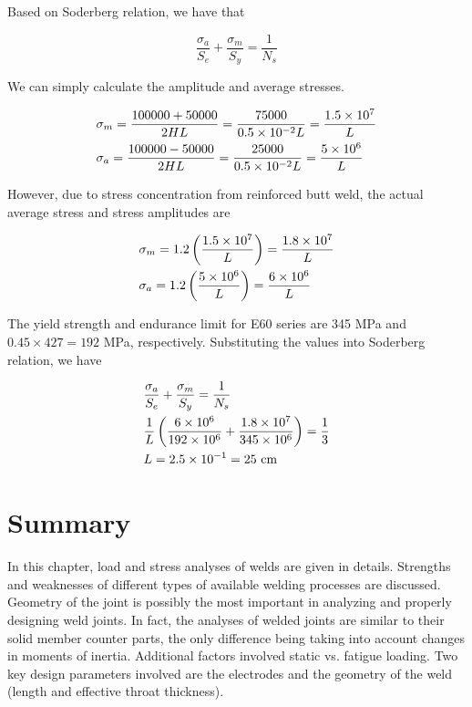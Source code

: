 \documentclass[
10pt,
a4paper,
openany,
svgnames,
]{book}
\begin{document}
\begin{solution}
  Based on Soderberg relation, we have that

  \[\frac{\sigma _a}{S_e} + \frac{\sigma _m}{S_y} = \frac{1}{N_s}\]

  We can simply calculate the amplitude and average stresses.

  \[\begin{gathered}
      \sigma_m = \frac{100000 + 50000}{2HL} = \frac{75000}{0.5 \times 10^{-2}L} = \frac{1.5 \times 10^7}{L} \hfill \\
      \sigma_a = \frac{100000 - 50000}{2HL} = \frac{25000}{0.5 \times 10^{-2}L} = \frac{5 \times 10^6}{L} \hfill \\ 
    \end{gathered} \]

  However, due to stress concentration from reinforced butt weld, the actual average stress and stress amplitudes are

  \[\begin{gathered}
      \sigma_m = 1.2\left( \frac{1.5 \times 10^7}{L} \right) = \frac{1.8 \times 10^7}{L} \hfill \\
      \sigma_a = 1.2\left( \frac{5 \times 10^6}{L} \right) = \frac{6 \times 10^6}{L} \hfill \\ 
    \end{gathered} \]

  The yield strength and endurance limit for E60 series are 345 MPa and $0.45 \times 427 = 192$ MPa, respectively. Substituting the values into Soderberg relation, we have

  \[\begin{gathered}
      \frac{\sigma_a}{S_e} + \frac{\sigma_m}{S_y} = \frac{1}{N_s} \hfill \\
      {1 \over L} \left( \frac{6 \times 10^6}{192 \times 10^6} + \frac{1.8 \times 10^7}{345 \times 10^6} \right) = \frac{1}{3} \hfill \\
      L = 2.5 \times {10^{-1}} = 25\text{ cm} \hfill \\ 
    \end{gathered} \]
\end{solution}

\section*{Summary}

In this chapter, load and stress analyses of welds are given in details. Strengths and weaknesses of different types of available welding processes are discussed. Geometry of the joint is possibly the most important in analyzing and properly designing weld joints. In fact, the analyses of welded joints are similar to their solid member counter parts, the only difference being taking into account changes in moments of inertia. Additional factors involved static vs. fatigue loading. Two key design parameters involved are the electrodes and the geometry of the weld (length and effective throat thickness).
\end{document}
